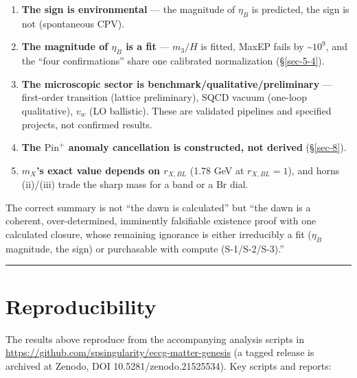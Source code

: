 \documentclass[aps,prd,preprint,nofootinbib,superscriptaddress]{revtex4-2}
\providecommand{\tightlist}{\setlength{\itemsep}{0pt}\setlength{\parskip}{0pt}}
\begin{document}
\begin{enumerate}
\def\labelenumi{\arabic{enumi}.}
\tightlist
\item
  \textbf{The sign is environmental} --- the magnitude of \(\eta_B\) is
  predicted, the sign is not (spontaneous CPV).
\item
  \textbf{The magnitude of \(\eta_B\) is a fit} --- \(m_3/H\) is fitted,
  MaxEP fails by \textasciitilde{}\(10^{9}\), and the ``four
  confirmations'' share one calibrated normalization (§\ref{sec-5-4}).
\item
  \textbf{The microscopic sector is benchmark/qualitative/preliminary}
  --- first-order transition (lattice preliminary), SQCD vacuum
  (one-loop qualitative), \(v_w\) (LO ballistic). These are validated
  pipelines and specified projects, not confirmed results.
\item
  \textbf{The \(\mathrm{Pin}^+\) anomaly cancellation is constructed,
  not derived} (§\ref{sec-8}).
\item
  \textbf{\(m_X\)'s exact value depends on \(r_{X,BL}\)} (1.78 GeV at
  \(r_{X,BL}=1\)), and horns (ii)/(iii) trade the sharp mass for a band
  or a \(\mathrm{Br}\) dial.
\end{enumerate}

The correct summary is not ``the dawn is calculated'' but ``the dawn is
a coherent, over-determined, imminently falsifiable existence proof with
one calculated closure, whose remaining ignorance is either irreducibly
a fit (\(\eta_B\) magnitude, the sign) or purchasable with compute
(S-1/S-2/S-3).''

\begin{center}\rule{0.5\linewidth}{0.5pt}\end{center}

\section{Reproducibility}\label{sec-12}

The results above reproduce from the accompanying analysis scripts in
\url{https://github.com/spsingularity/eccg-matter-genesis} (a tagged
release is archived at Zenodo, DOI 10.5281/zenodo.21525534). Key scripts
and reports:
\end{document}
